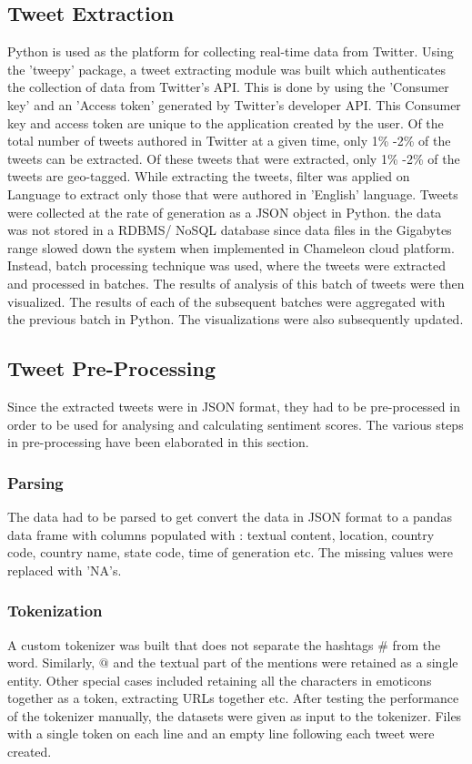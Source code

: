 \documentclass[9pt,twocolumn,twoside]{../../styles/osajnl}
\begin{document}
\subsection{Tweet Extraction}
Python is used as the platform for collecting real-time data from Twitter. Using the 'tweepy' package, a tweet extracting module was built which authenticates the collection of data from Twitter's API. This is done by using the 'Consumer key' and an 'Access token' generated by Twitter's developer API. This Consumer key and access token are unique to the application created by the user. Of the total number of tweets authored in Twitter at a given time, only 1\% -2\% of the tweets can be extracted. Of these tweets that were extracted, only 1\% -2\% of the tweets are geo-tagged. While extracting the tweets, filter was applied on Language to extract only those that were authored in 'English' language. Tweets were collected at the rate of generation as a JSON object in Python. the data was not stored in a RDBMS/ NoSQL database since data files in the Gigabytes range slowed down the system when implemented in Chameleon cloud platform. Instead, batch processing technique was used, where the tweets were extracted and processed in batches. The results of analysis of this batch of tweets were then visualized. The results of each of the subsequent batches were aggregated with the previous batch in Python. The visualizations were also subsequently updated. 
\subsection{Tweet Pre-Processing}
Since the extracted tweets were in JSON format, they had to be pre-processed in order to be used for analysing and calculating sentiment scores. The various steps in pre-processing have been elaborated in this section. 
\subsubsection{Parsing}
The data had to be parsed to get convert the data in JSON format to a pandas data frame with columns populated with : textual content, location, country code, country name, state code, time of generation etc. The missing values were replaced with 'NA's. 
\subsubsection{Tokenization}
A custom tokenizer was built that does not separate the hashtags $\#$ from the word. Similarly, $@$ and the textual part of the mentions were retained as a single entity. Other special cases included retaining all the characters in emoticons together as a token, extracting URLs together etc. After testing the performance of the tokenizer manually, the datasets were given as input to the tokenizer. Files with a single token on each line and an empty line following each tweet were created.
\end{document}
